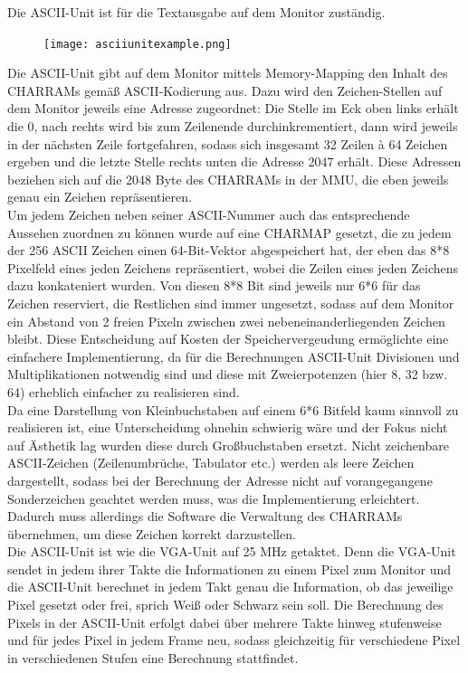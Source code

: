 
\label{ch:asciiunit}
Die ASCII-Unit ist f\"ur die Textausgabe auf dem Monitor zust\"andig.

\begin{figure}
	\centering
	\texttt{[image: asciiunitexample.png]}
	\label{fig:exampletext}
\end{figure}


Die ASCII-Unit gibt auf dem Monitor mittels Memory-Mapping den Inhalt des CHARRAMs gem{\"a}{\ss} ASCII-Kodierung aus. Dazu wird den Zeichen-Stellen auf dem Monitor jeweils eine Adresse zugeordnet: Die Stelle im Eck oben links erh\"alt die 0, nach rechts wird bis zum Zeilenende durchinkrementiert, dann wird jeweils in der n\"achsten Zeile fortgefahren, sodass sich insgesamt 32 Zeilen \`a 64 Zeichen ergeben und die letzte Stelle rechts unten die Adresse 2047 erh\"alt. Diese Adressen beziehen sich auf die 2048 Byte des CHARRAMs in der MMU, die eben jeweils genau ein Zeichen repr\"asentieren.\\
Um jedem Zeichen neben seiner ASCII-Nummer auch das entsprechende Aussehen zuordnen zu k\"onnen wurde auf eine CHARMAP gesetzt, die zu jedem der 256 ASCII Zeichen einen 64-Bit-Vektor abgespeichert hat, der eben das 8*8 Pixelfeld eines jeden Zeichens repr\"asentiert, wobei die Zeilen eines jeden Zeichens dazu konkateniert wurden. Von diesen 8*8 Bit sind jeweils nur 6*6 f\"ur das Zeichen reserviert, die Restlichen sind immer ungesetzt, sodass auf dem Monitor ein Abstand von 2 freien Pixeln zwischen zwei nebeneinanderliegenden Zeichen bleibt. Diese Entscheidung auf Kosten der Speichervergeudung erm\"oglichte eine einfachere Implementierung, da f\"ur die Berechnungen ASCII-Unit Divisionen und Multiplikationen notwendig sind und diese mit Zweierpotenzen (hier 8, 32 bzw. 64) erheblich einfacher zu realisieren sind.\\
Da eine Darstellung von Kleinbuchstaben auf einem 6*6 Bitfeld kaum sinnvoll zu realisieren ist, eine Unterscheidung ohnehin schwierig w\"are und der Fokus nicht auf \"Asthetik lag wurden diese durch Gro{\ss}buchstaben ersetzt.
Nicht zeichenbare ASCII-Zeichen (Zeilenumbr\"uche, Tabulator etc.) werden als leere Zeichen dargestellt, sodass bei der Berechnung der Adresse nicht auf vorangegangene Sonderzeichen geachtet werden muss, was die Implementierung erleichtert. Dadurch muss allerdings die Software die Verwaltung des CHARRAMs \"ubernehmen, um diese Zeichen korrekt darzustellen.\\
Die ASCII-Unit ist wie die VGA-Unit auf 25 MHz getaktet. Denn die VGA-Unit sendet in jedem ihrer Takte die Informationen zu einem Pixel zum Monitor und die ASCII-Unit berechnet in jedem Takt genau die Information, ob das jeweilige Pixel gesetzt oder frei, sprich Wei{\ss} oder Schwarz sein soll. Die Berechnung des Pixels in der ASCII-Unit erfolgt dabei \"uber mehrere Takte hinweg stufenweise und f\"ur jedes Pixel in jedem Frame neu, sodass gleichzeitig für verschiedene Pixel in verschiedenen Stufen eine Berechnung stattfindet.\\

